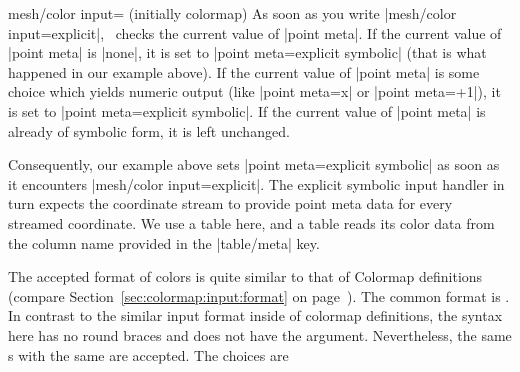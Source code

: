 {{\begin{pgfplotskey}{mesh/color input= (initially colormap)}
As soon as you write |mesh/color input=explicit|, \PGFPlots\ checks the current value of |point meta|. If the current value of |point meta| is |none|, it is set to |point meta=explicit symbolic| (that is what happened in our example above). If the current value of |point meta| is some choice which yields numeric output (like |point meta=x| or |point meta=+1|), it is set to |point meta=explicit symbolic|. If the current value of |point meta| is already of symbolic form, it is left unchanged.

Consequently, our example above sets |point meta=explicit symbolic| as soon as it encounters |mesh/color input=explicit|. The explicit symbolic input handler in turn expects the coordinate stream to provide point meta data for every streamed coordinate. We use a table here, and a table reads its color data from the column name provided in the |table/meta| key. 

The accepted format of colors is quite similar to that of Colormap definitions (compare Section~\ref{sec:colormap:input:format} on page~\pageref{sec:colormap:input:format}). The common format is . In contrast to the similar input format inside of colormap definitions, the syntax here has no round braces and does not have the  argument. Nevertheless, the same s with the same  are accepted. The choices are


\end{pgfplotskey}}}
